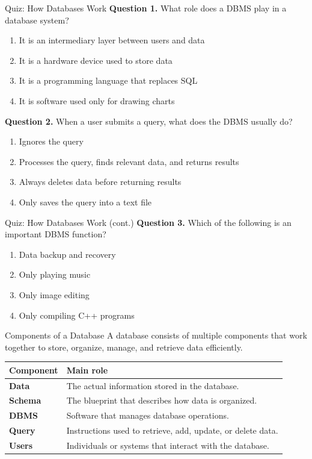 \documentclass[aspectratio=169,11pt]{beamer}
\newcommand{\tightlist}{\setlength{\itemsep}{2pt}\setlength{\parskip}{0pt}}
\newcommand{\qoption}[2]{\item[#1.] #2}
\begin{document}
\begin{frame}{Quiz: How Databases Work}
\small
\textbf{Question 1.} What role does a DBMS play in a database system?
\begin{enumerate}
\tightlist
  \qoption{A}{It is an intermediary layer between users and data}
  \qoption{B}{It is a hardware device used to store data}
  \qoption{C}{It is a programming language that replaces SQL}
  \qoption{D}{It is software used only for drawing charts}
\end{enumerate}

\textbf{Question 2.} When a user submits a query, what does the DBMS usually do?
\begin{enumerate}
\tightlist
  \qoption{A}{Ignores the query}
  \qoption{B}{Processes the query, finds relevant data, and returns results}
  \qoption{C}{Always deletes data before returning results}
  \qoption{D}{Only saves the query into a text file}
\end{enumerate}
\end{frame}

\begin{frame}{Quiz: How Databases Work (cont.)}
\small
\textbf{Question 3.} Which of the following is an important DBMS function?
\begin{enumerate}
\tightlist
  \qoption{A}{Data backup and recovery}
  \qoption{B}{Only playing music}
  \qoption{C}{Only image editing}
  \qoption{D}{Only compiling C++ programs}
\end{enumerate}
\end{frame}


\begin{frame}{Components of a Database}
\small
A database consists of multiple components that work together to store, organize, manage, and retrieve data efficiently.

\vspace{0.25cm}
\begin{tabularx}{\textwidth}{>{\bfseries}p{} X}
\toprule
Component & Main role \\
\midrule
Data & The actual information stored in the database. \\
Schema & The blueprint that describes how data is organized. \\
DBMS & Software that manages database operations. \\
Query & Instructions used to retrieve, add, update, or delete data. \\
Users & Individuals or systems that interact with the database. \\
\bottomrule
\end{tabularx}
\end{frame}
\end{document}
